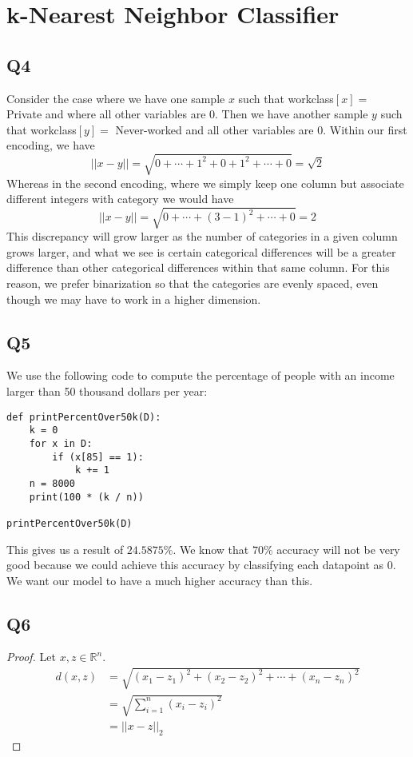 \documentclass{article}
\theoremstyle{definition}
\begin{document}
\section{k-Nearest Neighbor Classifier}
    \subsection{Q4}
        Consider the case where we have one sample $x$ such that workclass$[x] = $ Private 
        and where all other variables are 0. Then we have another sample $y$ such that 
        workclass$[y] = $ Never-worked and all other variables are 0. Within our first encoding, we have 
        \[
            ||x - y|| = \sqrt{ 0 + \cdots + 1^2 + 0 + 1^2 + \cdots + 0} = \sqrt{2}
        \]
        Whereas in the second encoding, where we simply keep one column but associate different integers with category we would have 
        \[
            ||x - y|| = \sqrt{0 + \cdots + (3 - 1)^2 + \cdots + 0} = 2
        \]
        This discrepancy will grow larger as the number of categories in a given column grows larger, and 
        what we see is certain categorical differences will be a greater difference than other categorical differences
        within that same column. For this reason, we prefer binarization so that the categories are evenly spaced,
        even though we may have to work in a higher dimension.
    \subsection{Q5}
    We use the following code to compute the percentage of people with an income larger than 50 thousand dollars per year:
        \begin{verbatim}
def printPercentOver50k(D):
    k = 0
    for x in D:
        if (x[85] == 1):
            k += 1
    n = 8000
    print(100 * (k / n))

printPercentOver50k(D)
            \end{verbatim}
            This gives us a result of $24.5875 \%$. We know that $70\%$ accuracy will not be very good because we could achieve 
            this accuracy by classifying each datapoint as 0. We want our model to have a much higher accuracy than this.
    \subsection{Q6}
        \begin{proof}
            Let $x, z \in \mathbb{R}^n$.
            \begin{align*}
                d(x, z) &= \sqrt{(x_1 - z_1)^2 + (x_2 - z_2)^2 + \cdots + (x_n - z_n)^2} \\
                &= \sqrt{\sum_{i = 1}^n (x_i - z_i)^2} \\
                &= ||x - z||_2
            \end{align*}
        \end{proof}
\end{document}
